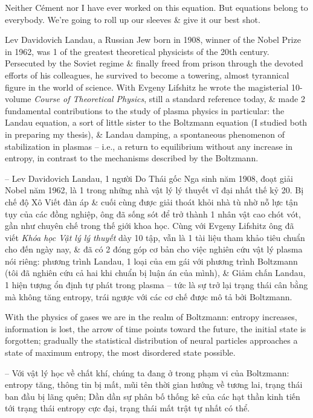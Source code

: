 \documentclass{article}
\begin{document}
\begin{enumerate}
	Neither C\'ement nor I have ever worked on this equation. But equations belong to everybody. We're going to roll up our sleeves \& give it our best shot.

	{\sc Lev Davidovich Landau}, a Russian Jew born in 1908, winner of the Nobel Prize in 1962, was 1 of the greatest theoretical physicists of the 20th century. Persecuted by the Soviet regime \& finally freed from prison through the devoted efforts of his colleagues, he survived to become a towering, almost tyrannical figure in the world of science. With {\sc Evgeny Lifshitz} he wrote the magisterial 10-volume {\it Course of Theoretical Physics}, still a standard reference today, \& made 2 fundamental contributions to the study of plasma physics in particular: the Landau equation, a sort of little sister to the Boltzmann equation (I studied both in preparing my thesis), \& Landau damping, a spontaneous phenomenon of stabilization in plasmas -- i.e., a return to equilibrium without any increase in entropy, in contrast to the mechanisms described by the {\sc Boltzmann}.

	-- {\sc Lev Davidovich Landau}, 1 người Do Thái gốc Nga sinh năm 1908, đoạt giải Nobel năm 1962, là 1 trong những nhà vật lý lý thuyết vĩ đại nhất thế kỷ 20. Bị chế độ Xô Viết đàn áp \& cuối cùng được giải thoát khỏi nhà tù nhờ nỗ lực tận tụy của các đồng nghiệp, ông đã sống sót để trở thành 1 nhân vật cao chót vót, gần như chuyên chế trong thế giới khoa học. Cùng với {\sc Evgeny Lifshitz} ông đã viết {\it Khóa học Vật lý lý thuyết} dày 10 tập, vẫn là 1 tài liệu tham khảo tiêu chuẩn cho đến ngày nay, \& đã có 2 đóng góp cơ bản cho việc nghiên cứu vật lý plasma nói riêng: phương trình Landau, 1 loại của em gái với phương trình Boltzmann (tôi đã nghiên cứu cả hai khi chuẩn bị luận án của mình), \& Giảm chấn Landau, 1 hiện tượng ổn định tự phát trong plasma -- tức là sự trở lại trạng thái cân bằng mà không tăng entropy, trái ngược với các cơ chế được mô tả bởi {\sc Boltzmann}.

	With the physics of gases we are in the realm of {\sc Boltzmann}: entropy increases, information is lost, the arrow of time points toward the future, the initial state is forgotten; gradually the statistical distribution of neural particles approaches a state of maximum entropy, the most disordered state possible.

	-- Với vật lý học về chất khí, chúng ta đang ở trong phạm vi của {\sc Boltzmann}: entropy tăng, thông tin bị mất, mũi tên thời gian hướng về tương lai, trạng thái ban đầu bị lãng quên; Dần dần sự phân bố thống kê của các hạt thần kinh tiến tới trạng thái entropy cực đại, trạng thái mất trật tự nhất có thể.


\end{enumerate}
\end{document}
